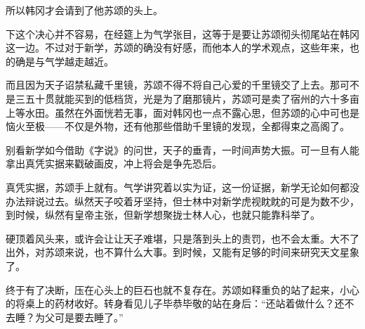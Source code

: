 所以韩冈才会请到了他苏颂的头上。

下这个决心并不容易，在经筵上为气学张目，这等于是要让苏颂彻头彻尾站在韩冈这一边。不过对于新学，苏颂的确没有好感，而他本人的学术观点，这些年来，也的确是与气学越走越近。

而且因为天子诏禁私藏千里镜，苏颂不得不将自己心爱的千里镜交了上去。那可不是三五十贯就能买到的低档货，光是为了磨那镜片，苏颂可是卖了宿州的六十多亩上等水田。虽然在外面恍若无事，面对韩冈也一点不露心思，但苏颂的心中可也是恼火至极——不仅是外物，还有他那些借助千里镜的发现，全都得束之高阁了。

别看新学如今借助《字说》的问世，天子的垂青，一时间声势大振。可一旦有人能拿出真凭实据来戳破画皮，冲上将会是争先恐后。

真凭实据，苏颂手上就有。气学讲究着以实为证，这一份证据，新学无论如何都没办法辩说过去。纵然天子咬着牙坚持，但士林中对新学虎视眈眈的可是为数不少，到时候，纵然有皇帝主张，但新学想聚拢士林人心，也就只能靠科举了。

硬顶着风头来，或许会让让天子难堪，只是落到头上的责罚，也不会太重。大不了出外，对苏颂来说，也不算什么大事。到时候，又能有足够的时间来研究天文星象了。

终于有了决断，压在心头上的巨石也就不复存在。苏颂如释重负的站了起来，小心的将桌上的药材收好。转身看见儿子毕恭毕敬的站在身后：“还站着做什么？还不去睡？为父可是要去睡了。”


